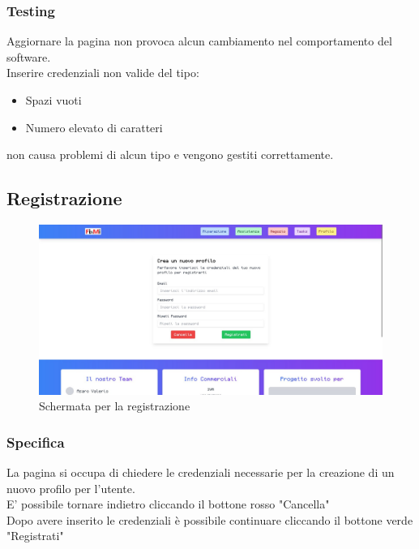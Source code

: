 \documentclass{report}
\begin{document}
\subsubsection*{Testing}
Aggiornare la pagina non provoca alcun cambiamento nel comportamento del software.\\Inserire credenziali non valide del tipo:
\begin{itemize}
	\item Spazi vuoti
	\item Numero elevato di caratteri
\end{itemize}
non causa problemi di alcun tipo e vengono gestiti correttamente.


\subsection{Registrazione}

\begin{figure}[H]
	\centering\includegraphics[width=1\textwidth]{images/microservizio-autenticazione/frontend/registrazione.jpg}
	Schermata per la registrazione
\end{figure}
\subsubsection*{Specifica}
La pagina si occupa di chiedere le credenziali necessarie per la creazione di un nuovo profilo per l'utente.\\
E' possibile tornare indietro cliccando il bottone rosso "Cancella"\\
Dopo avere inserito le credenziali è possibile continuare cliccando il bottone verde "Registrati"
\end{document}
